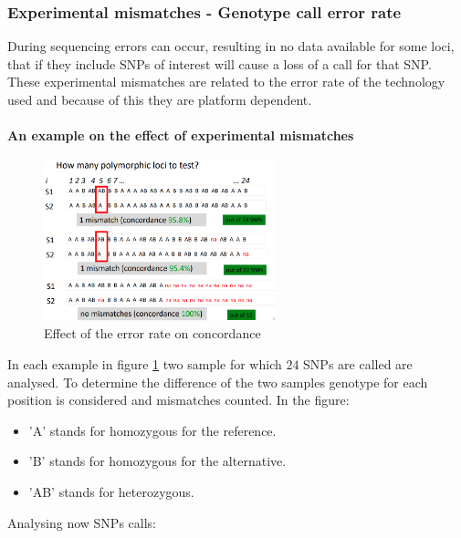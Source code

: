 		\subsubsection{Experimental mismatches - Genotype call error rate}
		During sequencing errors can occur, resulting in no data available for some loci, that if they include SNPs of interest will cause a loss of a call for that SNP.
		These experimental mismatches are related to the error rate of the technology used and because of this they are platform dependent.

			\paragraph{An example on the effect of experimental mismatches}

			\begin{figure}[H]
				\centering
				\includegraphics[width=0.6\textwidth]{SNP.PNG}
				\caption{Effect of the error rate on concordance}
				\label{fig:SNP}
			\end{figure}

			In each example in figure \ref{fig:SNP} two sample for which $24$ SNPs are called are analysed.
			To determine the difference of the two samples genotype for each position is considered and mismatches counted.
			In the figure:

			\begin{multicols}{3}
				\begin{itemize}
					\item 'A' stands for homozygous for the reference.
					\item 'B' stands for homozygous for the alternative.
					\item 'AB' stands for heterozygous.
				\end{itemize}
			\end{multicols}

			Analysing now SNPs calls:

